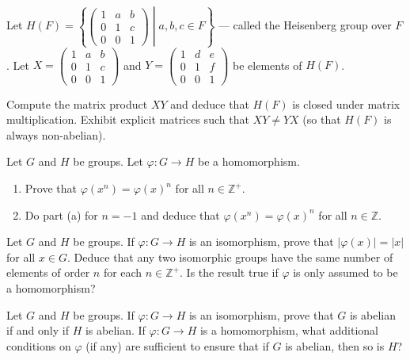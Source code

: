 \documentclass[
    11pt,a4paper,
]{exam}
\begin{document}
\begin{questions}
    \question
    Let \(H(F)=\left\{\left.\left(\begin{array}{lll}1 & a & b \\ 0 & 1 & c \\ 0 & 0 & 1\end{array}\right) \;\right|\; a, b, c \in F\right\}\) --- called the Heisenberg group over \(F\).
    Let \(X=\left(\begin{array}{lll}1 & a & b \\ 0 & 1 & c \\ 0 & 0 & 1\end{array}\right)\) and \(Y=\left(\begin{array}{lll}1 & d & e \\ 0 & 1 & f \\ 0 & 0 & 1\end{array}\right)\) be elements of \(H(F)\).
    
    Compute the matrix product \(X Y\) and deduce that \(H(F)\) is closed under matrix multiplication. Exhibit explicit matrices such that \(X Y \neq Y X\) (so that \(H(F)\) is always non-abelian).
    
    
    
    \question
    
    Let \(G\) and \(H\) be groups.  Let \(\varphi: {G} \rightarrow {H}\) be a homomorphism.
    \begin{enumerate}[label=(\alph*)]
        \item Prove that \(\varphi\left(x^n\right)=\varphi(x)^n\) for all \(n \in \mathbb{Z}^{+}\).
        \item  Do part (a) for \(n=-1\) and deduce that \(\varphi\left(x^n\right)=\varphi(x)^n\) for all \(n \in \mathbb{Z}\).
    \end{enumerate}
    
    
    
    
    
    \question
    
    Let \(G\) and \(H\) be groups. If \(\varphi: G \rightarrow H\) is an isomorphism, prove that \(|\varphi(x)|=|x|\) for all \(x \in G\). Deduce that any two isomorphic groups have the same number of elements of order \(n\) for each \(n \in \mathbb{Z}^{+}\). Is the result true if \(\varphi\) is only assumed to be a homomorphism?
    
    \question
    Let \(G\) and \(H\) be groups. If \(\varphi: G \rightarrow H\) is an isomorphism, prove that \(G\) is abelian if and only if \(H\) is abelian. If \(\varphi: G \rightarrow H\) is a homomorphism, what additional conditions on \(\varphi\) (if any) are sufficient to ensure that if \(G\) is abelian, then so is \(H\)?
    

\end{questions}
\end{document}
